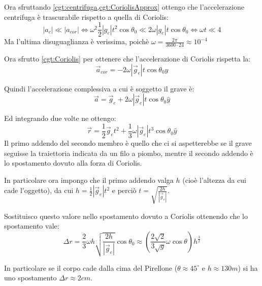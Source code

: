 \documentclass[../main.tex]{subfiles}
\begin{document}
Ora sfruttando \cref{cgt:centrifuga,cgt:CoriolisApprox} ottengo che l'accelerazione centrifuga è trascurabile rispetto
a quella di Coriolis:
\begin{equation*}
	|a_c|\ll|a_{cor}| \iff \omega^2\frac 12|g_e|t^2\cos \theta_0\ll 2\omega|g_e| t\cos \theta_0 \iff
	\omega t\ll 4
\end{equation*}
Ma l'ultima disuguaglianza è verissima, poichè $\omega=\frac{2\pi}{3600\cdot 24}\approx 10^{-4}$

Ora sfrutto \cref{cgt:Coriolis} per ottenere che l'accelerazione di Coriolis rispetta la:
\begin{equation*}
	\vec a_{cor}=-2\omega |\vec g_e| t \cos \theta_0 \hat y
\end{equation*}

Quindi l'accelerazione complessiva a cui è soggetto il grave è:
\begin{equation*}
	\vec a = \vec g_e + 2\omega |\vec g_e| t \cos \theta_0 \hat y
\end{equation*}

Ed integrando due volte ne ottengo:
\begin{equation*}
	\vec r = \frac 12 \vec g_e t^2 + \frac 13\omega |\vec g_e| t^3 \cos \theta_0 \hat y
\end{equation*}
Il primo addendo del secondo membro è quello che ci si aspetterebbe se il grave seguisse la traiettoria indicata da 
un filo a piombo, mentre il secondo addendo è lo spostamento dovuto alla forza di Coriolis.

In particolare ora impongo che il primo addendo valga $h$ (cioè l'altezza da cui cade l'oggetto), da cui 
$h=\frac 12 |\vec g_e| t^2$ e perciò $t=\sqrt{\frac{2h}{|\vec g_e|}}$.

Sostituisco questo valore nello spostamento dovuto a Coriolis ottenendo che lo spostamento vale:
\begin{equation}
	\Delta r = \frac 23\omega h \sqrt{\frac{2h}{|\vec g_e|}} \cos \theta_0 \approx
	\left(\frac {2\sqrt 2}{3\sqrt g} \omega \cos\theta\right) h^{\frac 32}
\end{equation}

In particolare se il corpo cade dalla cima del Pirellone ($\theta\approx 45^{\circ}$ e $h\approx 130m$) si ha
uno spostamento $\Delta r \approx 2cm$.
\end{document}
